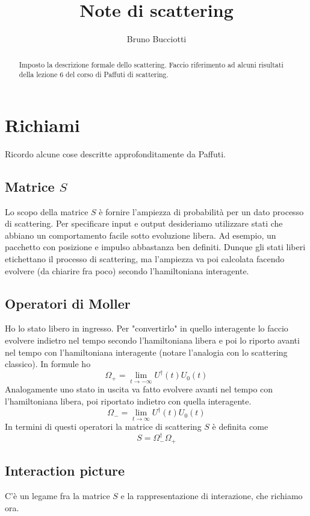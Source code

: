 \documentclass[]{article}
\title{Note di scattering}
\author{Bruno Bucciotti}
\begin{document}
\maketitle

\begin{abstract}
Imposto la descrizione formale dello scattering. Faccio riferimento ad alcuni risultati della lezione 6 del corso di Paffuti di scattering.
\end{abstract}

\section{Richiami}
Ricordo alcune cose descritte approfonditamente da Paffuti.
\subsection{Matrice $S$}
Lo scopo della matrice $S$ è fornire l'ampiezza di probabilità per un dato processo di scattering. Per specificare input e output desideriamo utilizzare stati che abbiano un comportamento facile sotto evoluzione libera. Ad esempio, un pacchetto con posizione e impulso abbastanza ben definiti. Dunque gli stati liberi etichettano il processo di scattering, ma l'ampiezza va poi calcolata facendo evolvere (da chiarire fra poco) secondo l'hamiltoniana interagente. 

\subsection{Operatori di Moller}
Ho lo stato libero in ingresso. Per "convertirlo" in quello interagente lo faccio evolvere indietro nel tempo secondo l'hamiltoniana libera e poi lo riporto avanti nel tempo con l'hamiltoniana interagente (notare l'analogia con lo scattering classico). In formule ho
\[ \Omega_+ = \lim_{t\rightarrow -\infty} U^\dagger(t) U_0(t) \]
Analogamente uno stato in uscita va fatto evolvere avanti nel tempo con l'hamiltoniana libera, poi riportato indietro con quella interagente.
\[ \Omega_- = \lim_{t\rightarrow \infty} U^\dagger(t) U_0(t) \]
In termini di questi operatori la matrice di scattering $S$ è definita come
\[ S = \Omega_-^\dagger \Omega_+ \]

\subsection{Interaction picture}
C'è un legame fra la matrice $S$ e la rappresentazione di interazione, che richiamo ora.
\end{document}
